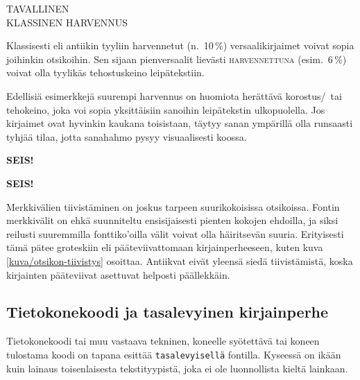 \begin{tulossis}
  \large
  TAVALLINEN \\
  { KLASSINEN HARVENNUS}
\end{tulossis}

Klassisesti eli antiikin tyyliin harvennetut (n.~10\,\%)
versaalikirjaimet voivat sopia joihinkin otsikoihin. Sen sijaan
pienversaalit lievästi {
  \textsc{harvennettuna}} (esim.~6\,\%) voivat olla tyylikäs
tehostuskeino leipätekstiin.

Edellisiä esimerkkejä suurempi harvennus on huomiota herättävä
korostus\-/\ tai tehokeino, joka voi sopia yksittäisiin sanoihin
leipätekstin ulkopuolella. Jos kirjaimet ovat hyvinkin kaukana
toisistaan, täytyy sanan ympärillä olla runsaasti tyhjää tilaa, jotta
sanahahmo pysyy visuaalisesti koossa.

\begin{koodilohkosis}
{\sffamily\bfseries{} SEIS!}
\end{koodilohkosis}

\begin{tulossis}
  {\sffamily\bfseries{} SEIS!}
\end{tulossis}

Merkkivälien tiivistäminen on joskus tarpeen suurikokoisissa otsikoissa.
Fontin merkkivälit on ehkä suunniteltu ensisijaisesti pienten kokojen
ehdoilla, ja siksi reilusti suuremmilla fonttiko'oilla välit voivat olla
häiritsevän suuria. Erityisesti tämä pätee groteskiin eli
pääteviivattomaan kirjainperheeseen, kuten kuva
\ref{kuva/otsikon-tiivistys} osoittaa. Antiikvat eivät yleensä siedä
tiivistämistä, koska kirjainten pääteviivat asettuvat helposti
päällekkäin.


\subsection{Tietokonekoodi ja tasalevyinen kirjainperhe}

Tietokonekoodi tai muu vastaava tekninen, koneelle syötettävä tai koneen
tulostama koodi on tapana esittää \texttt{tasalevyisellä} fontilla.
Kyseessä on ikään kuin lainaus toisenlaisesta tekstityypistä, joka ei
ole luonnollista kieltä lainkaan.

